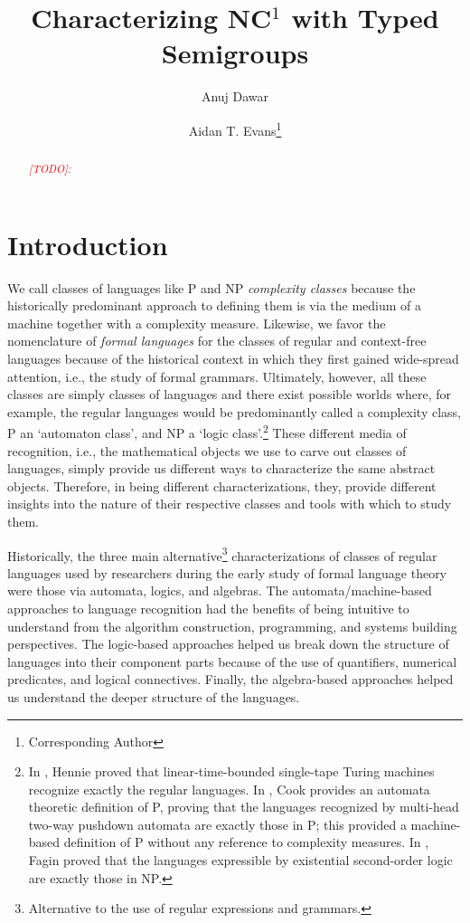 \documentclass[a4paper,UKenglish,cleveref, autoref, thm-restate, anonymous]{lipics-v2021}
\title{Characterizing NC${}^1$ with Typed Semigroups} %
\author{Anuj Dawar}{Department of Computer Science and Technology, University of Cambridge, United Kingdom \and \url{https://www.cl.cam.ac.uk/~ad260/} }{anuj.dawar@cl.cam.ac.uk}{https://orcid.org/0000-0003-4014-8248}{(Optional) author-specific funding acknowledgements}%
\author{Aidan T. Evans\footnote{Corresponding Author}}{Department of Computer Science and Technology, University of Cambridge, United Kingdom \and \url{https://www.aidantevans.com/} }{ate26@cam.ac.uk}{https://orcid.org/0009-0007-9084-3608}{[funding]}
\newcommand{\todo}[1]{\textit{\textcolor{red}{[TODO]: #1}}}
\begin{document}
\maketitle

\begin{abstract}
    \todo{}
\end{abstract}

\newpage

\section{Introduction}


We call classes of languages like P and NP \emph{complexity classes} because the historically predominant approach to defining them is via the medium of a machine together with a complexity measure. Likewise, we favor the nomenclature of \emph{formal languages} for the classes of regular and context-free languages because of the historical context in which they first gained wide-spread attention, i.e., the study of formal grammars.  Ultimately, however, all these classes are simply classes of languages and there exist possible worlds where, for example, the regular languages would be predominantly called a complexity class, P an `automaton class', and NP a `logic class'.\footnote{In \cite{hennie1965one}, Hennie proved that linear-time-bounded single-tape Turing machines recognize exactly the regular languages. In \cite{cook1971characterizations}, Cook provides an automata theoretic definition of P, proving that the languages recognized by multi-head two-way pushdown automata are exactly those in P; this provided a machine-based definition of P without any reference to complexity measures. In \cite{fagin1974generalized}, Fagin proved that the languages expressible by existential second-order logic are exactly those in NP.} These different media of recognition, i.e., the mathematical objects we use to carve out classes of languages, simply provide us different ways to characterize the same abstract objects. Therefore, in being different characterizations, they, provide different insights into the nature of their respective classes and tools with which to study them.

Historically, the three main alternative\footnote{Alternative to the use of regular expressions and grammars.} characterizations of classes of regular languages used by researchers during the early study of formal language theory were those via automata, logics, and algebras. The automata/machine-based approaches to language recognition had the benefits of being intuitive to understand from the algorithm construction, programming, and systems building perspectives. The logic-based approaches helped us break down the structure of languages into their component parts because of the use of quantifiers, numerical predicates, and logical connectives. Finally, the algebra-based approaches helped us understand the deeper structure of the languages.
\end{document}
